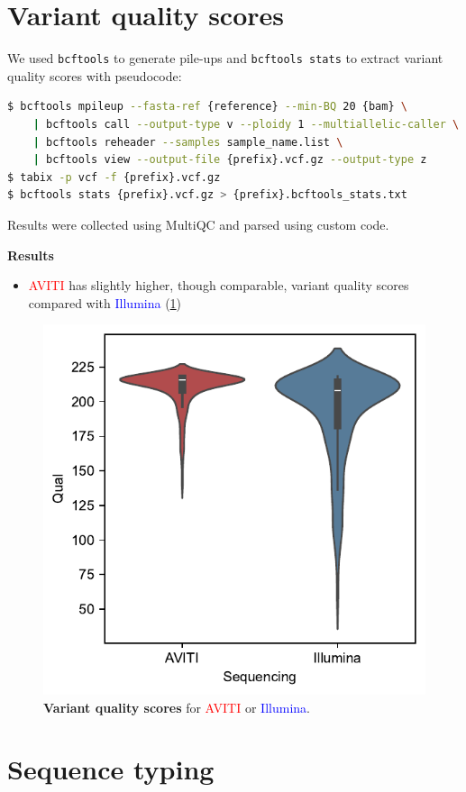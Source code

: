 \documentclass{article}
\begin{document}
\section{Variant quality scores}

We used \texttt{bcftools} to generate pile-ups and \texttt{bcftools stats} to extract variant quality scores with pseudocode:

\begin{lstlisting}[language=bash]
$ bcftools mpileup --fasta-ref {reference} --min-BQ 20 {bam} \
    | bcftools call --output-type v --ploidy 1 --multiallelic-caller \
    | bcftools reheader --samples sample_name.list \
    | bcftools view --output-file {prefix}.vcf.gz --output-type z
$ tabix -p vcf -f {prefix}.vcf.gz
$ bcftools stats {prefix}.vcf.gz > {prefix}.bcftools_stats.txt
\end{lstlisting}
    
Results were collected using MultiQC and parsed using custom code.

\textbf{Results}

\begin{itemize}
    \item \textcolor{red}{AVITI} has slightly higher, though comparable, variant quality scores compared with \textcolor{blue}{Illumina} (\cref{figure:variants})
\end{itemize}

\begin{figure}[H]
    \centering
    \includegraphics[width=.45\textwidth]{figures/variant_quality_scores.pdf}
    \caption{
        \textbf{Variant quality scores} for \textcolor{red}{AVITI} or \textcolor{blue}{Illumina}.
    }
    \label{figure:variants}
\end{figure}

\section{Sequence typing}
\end{document}
